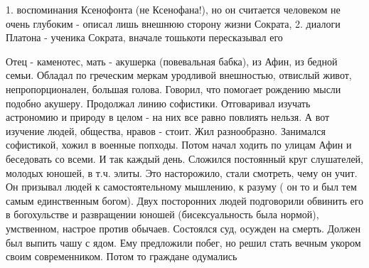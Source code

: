 	1. воспоминания Ксенофонта (не Ксенофана!), но он считается человеком не очень глубоким - описал лишь внешнюю сторону жизни Сократа,
	2. диалоги Платона - ученика Сократа, вначале тошькоти пересказывал его

Отец - каменотес, мать - акушерка (повевальная бабка), из Афин, из бедной семьи. Обладал по греческим меркам уродливой внешностью, отвислый живот, непропорционален, большая голова. Говорил, что помогает рождению мысли подобно акушеру. Продолжал линию софистики. Отговаривал изучать астрономию и природу в целом - на них все равно повлиять нельзя. А вот изучение людей, общества, нравов - стоит.
Жил разнообразно. Занимался софистикой, хожил в военные попходы. Потом начал ходить по улицам Афин и беседовать со всеми. И так каждый день. Сложился постоянный круг слушателей, молодых юношей, в т.ч. элиты. Это насторожило, стали смотреть, чему он учит. Он призывал людей к самостоятельному мышлению, к разуму ( он то и был тем самым единственным богом). Двух посторонних людей подговорили обвинить его в богохульстве и развращении юношей (бисексуальность была нормой), умственном, настрое против обычаев. Состоялся суд, осужден на смерть. Должен был выпить чашу с ядом. Ему предложили побег, но решил стать вечным укором своим современником. Потом то граждане одумались
